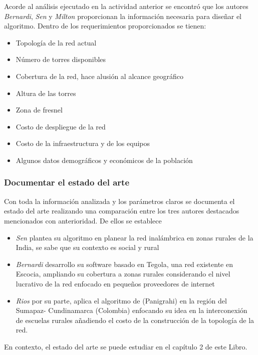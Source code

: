 \documentclass[]{article}
\providecommand{\tightlist}{%
  \setlength{\itemsep}{0pt}\setlength{\parskip}{0pt}}
\begin{document}
Acorde al análisis ejecutado en la actividad anterior se encontró que
los autores \emph{Bernardi}, \emph{Sen} y \emph{Milton} proporcionan la
información necesaria para diseñar el algoritmo. Dentro de los
requerimientos proporcionados se tienen:

\begin{itemize}
\tightlist
\item
  Topología de la red actual
\item
  Número de torres disponibles
\item
  Cobertura de la red, hace alusión al alcance geográfico
\item
  Altura de las torres
\item
  Zona de fresnel
\item
  Costo de despliegue de la red
\item
  Costo de la infraestructura y de los equipos
\item
  Algunos datos demográficos y económicos de la población
\end{itemize}

\subsubsection{\texorpdfstring{\textbf{Documentar el estado del
arte}}{Documentar el estado del arte}}\label{documentar-el-estado-del-arte}

Con toda la información analizada y los parámetros claros se documenta
el estado del arte realizando una comparación entre los tres autores
destacados mencionados con anterioridad. De ellos se establece

\begin{itemize}
\item
  \emph{Sen} plantea su algoritmo en planear la red inalámbrica en zonas
  rurales de la India, se sabe que su contexto es social y rural
\item
  \emph{Bernardi} desarrollo su software basado en Tegola, una red
  existente en Escocia, ampliando su cobertura a zonas rurales
  considerando el nivel lucrativo de la red enfocado en pequeños
  proveedores de internet
\item
  \emph{Rios} por su parte, aplica el algoritmo de (Panigrahi) en la
  región del Sumapaz- Cundinamarca (Colombia) enfocando su idea en la
  interconexión de escuelas rurales añadiendo el costo de la
  construcción de la topología de la red.
\end{itemize}

En contexto, el estado del arte se puede estudiar en el capítulo 2 de
este Libro.
\end{document}
